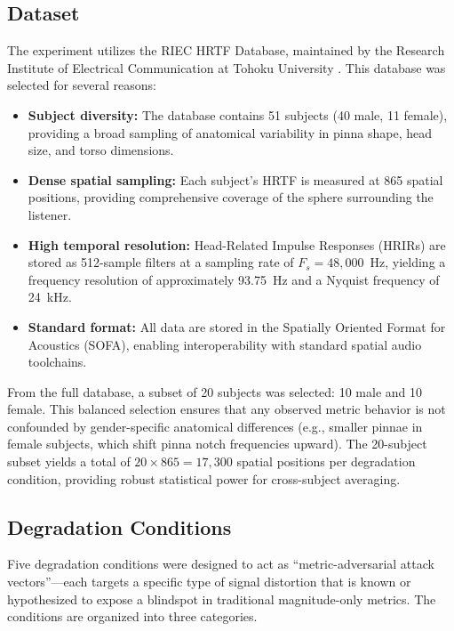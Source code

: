 \documentclass[12pt,a4paper]{article}
\begin{document}
\subsection{Dataset}

The experiment utilizes the RIEC HRTF Database, maintained by the Research Institute of Electrical Communication at Tohoku University \cite{watanabe2014}. This database was selected for several reasons:

\begin{itemize}
  \item \textbf{Subject diversity:} The database contains 51 subjects (40 male, 11 female), providing a broad sampling of anatomical variability in pinna shape, head size, and torso dimensions.
  \item \textbf{Dense spatial sampling:} Each subject's HRTF is measured at 865 spatial positions, providing comprehensive coverage of the sphere surrounding the listener.
  \item \textbf{High temporal resolution:} Head-Related Impulse Responses (HRIRs) are stored as 512-sample filters at a sampling rate of $F_s = 48{,}000$~Hz, yielding a frequency resolution of approximately 93.75~Hz and a Nyquist frequency of 24~kHz.
  \item \textbf{Standard format:} All data are stored in the Spatially Oriented Format for Acoustics (SOFA), enabling interoperability with standard spatial audio toolchains.
\end{itemize}

From the full database, a subset of 20 subjects was selected: 10 male and 10 female. This balanced selection ensures that any observed metric behavior is not confounded by gender-specific anatomical differences (e.g., smaller pinnae in female subjects, which shift pinna notch frequencies upward). The 20-subject subset yields a total of $20 \times 865 = 17{,}300$ spatial positions per degradation condition, providing robust statistical power for cross-subject averaging.

\subsection{Degradation Conditions}

Five degradation conditions were designed to act as ``metric-adversarial attack vectors''---each targets a specific type of signal distortion that is known or hypothesized to expose a blindspot in traditional magnitude-only metrics. The conditions are organized into three categories.
\end{document}
